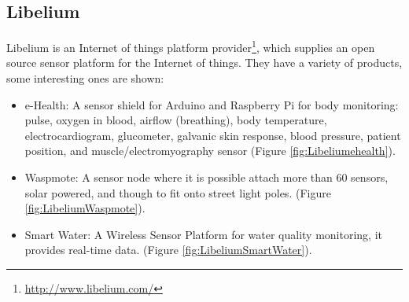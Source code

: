 \documentclass[12pt, a4paper,twoside]{tesi_upf}
\begin{document}
    \subsection{Libelium}
      Libelium is an Internet of things platform provider\footnote{\url{http://www.libelium.com/}}, which supplies an open source sensor platform for the Internet of things.
      They have a variety of products, some interesting ones are shown:
      \begin{itemize}
        \item e-Health: A sensor shield for Arduino and Raspberry Pi for body monitoring: pulse, oxygen in blood, airflow (breathing), body temperature, electrocardiogram, glucometer, galvanic skin response, blood pressure, patient position, and muscle/electromyography sensor (Figure \ref{fig:Libeliumehealth}).
        
        \item Waspmote: A sensor node where it is possible attach more than 60 sensors, solar powered, and though to fit onto street light poles. (Figure \ref{fig:LibeliumWaspmote}).
       
       \item Smart Water: A Wireless Sensor Platform for water quality monitoring, it provides real-time data. (Figure \ref{fig:LibeliumSmartWater}).
     \end{itemize}
      
\end{document}
